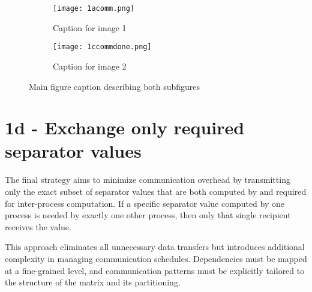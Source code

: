 \begin{figure}[H]
    \centering
    \begin{subfigure}[t]{0.45\textwidth}
        \centering
        \texttt{[image: 1acomm.png]}
        \caption{Caption for image 1}
        \label{fig:1ccomm1}
    \end{subfigure}
    \hfill
    \begin{subfigure}[t]{0.45\textwidth}
        \centering
        \texttt{[image: 1ccommdone.png]}
        \caption{Caption for image 2}
        \label{fig:1ccomm2}
    \end{subfigure}
    \caption{Main figure caption describing both subfigures}
    \label{fig:1ccomm}
\end{figure}

\section{1d - Exchange only required separator values}
The final strategy aims to minimize communication overhead by transmitting only the exact subset of separator values that are both computed by and required for inter-process computation. If a specific separator value computed by one process is needed by exactly one other process, then only that single recipient receives the value.

This approach eliminates all unnecessary data transfers but introduces additional complexity in managing communication schedules. Dependencies must be mapped at a fine-grained level, and communication patterns must be explicitly tailored to the structure of the matrix and its partitioning.
